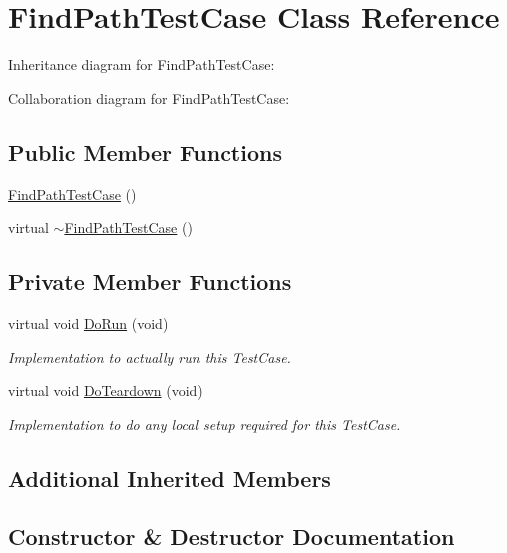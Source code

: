 \hypertarget{classFindPathTestCase}{}\section{Find\+Path\+Test\+Case Class Reference}
\label{classFindPathTestCase}


Inheritance diagram for Find\+Path\+Test\+Case\+:


Collaboration diagram for Find\+Path\+Test\+Case\+:
\subsection*{Public Member Functions}
\begin{DoxyCompactItemize}
\item 
\hyperlink{classFindPathTestCase_a7a87d836a0d0a83765f484b0d938cbd1}{Find\+Path\+Test\+Case} ()
\item 
virtual \hyperlink{classFindPathTestCase_abf571d21b5bc9ce52d545c1b686f337c}{$\sim$\+Find\+Path\+Test\+Case} ()
\end{DoxyCompactItemize}
\subsection*{Private Member Functions}
\begin{DoxyCompactItemize}
\item 
virtual void \hyperlink{classFindPathTestCase_a0cd0fed9b6488881c2c1e0d49225f460}{Do\+Run} (void)
\begin{DoxyCompactList}\small\item\em Implementation to actually run this Test\+Case. \end{DoxyCompactList}\item 
virtual void \hyperlink{classFindPathTestCase_a82112f15bd8dd2edbf4d55c84a206494}{Do\+Teardown} (void)
\begin{DoxyCompactList}\small\item\em Implementation to do any local setup required for this Test\+Case. \end{DoxyCompactList}\end{DoxyCompactItemize}
\subsection*{Additional Inherited Members}


\subsection{Constructor \& Destructor Documentation}
